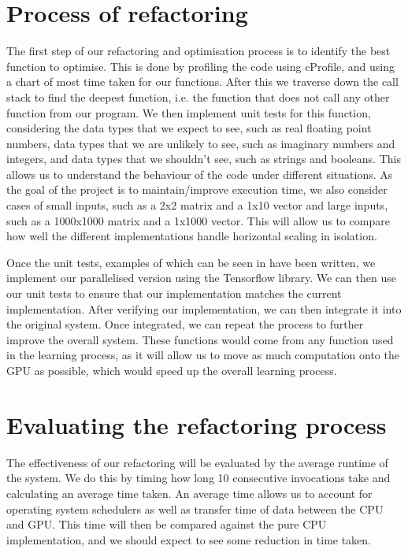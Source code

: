 \section{Process of refactoring}
The first step of our refactoring and optimisation process is to identify the best function to optimise. 
This is done by profiling the code using cProfile, and using a chart of most time taken for our functions.
After this we traverse down the call stack to find the deepest function, i.e. the function that does not call any other function from our program.
We then implement unit tests for this function, considering the data types that we expect to see, such as real floating point numbers, data types that we are unlikely to see, such as imaginary numbers and integers, and data types that we shouldn't see, such as strings and booleans.
This allows us to understand the behaviour of the code under different situations.
As the goal of the project is to maintain/improve execution time, we also consider cases of small inputs, such as a 2x2 matrix and a 1x10 vector and large inputs, such as a 1000x1000 matrix and a 1x1000 vector.
This will allow us to compare how well the different implementations handle horizontal scaling in isolation.

Once the unit tests, examples of which can be seen in  have been written, we implement our parallelised version using the Tensorflow library.
We can then use our unit tests to ensure that our implementation matches the current implementation.
After verifying our implementation, we can then integrate it into the original system.
Once integrated, we can repeat the process to further improve the overall system.
These functions would come from any function used in the learning process, as it will allow us to move as much computation onto the GPU as possible, which would speed up the overall learning process.




\section{Evaluating the refactoring process}
The effectiveness of our refactoring will be evaluated by the average runtime of the system.
We do this by timing how long 10 consecutive invocations take and calculating an average time taken.
An average time allows us to account for operating system schedulers as well as transfer time of data between the CPU and GPU.
This time will then be compared against the pure CPU implementation, and we should expect to see some reduction in time taken.

